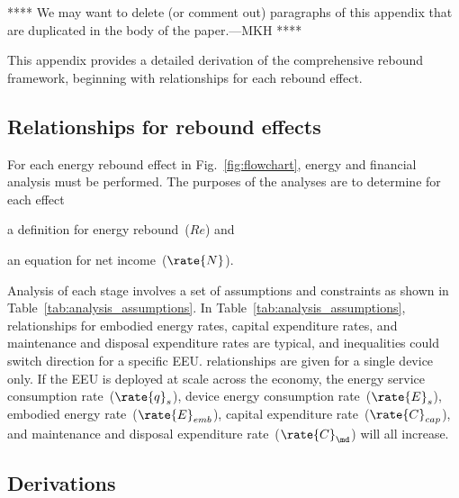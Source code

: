 

**** 
We may want to delete (or comment out)
paragraphs of this appendix that are duplicated
in the body of the paper.---MKH
****

This appendix provides a detailed derivation of the comprehensive rebound framework,
beginning with relationships for each rebound effect.


\subsection{Relationships for rebound effects}
\label{sec:relationships_for_stages}

For each energy rebound effect in Fig.~\ref{fig:flowchart},
energy and financial analysis must be performed.
The purposes of the analyses are to determine for each effect
%
\begin{enumerate*}[label={(\alph*)}]

  \item a definition for energy rebound~($Re$) and

  \item an equation for net income~($\rate{N}$).

\end{enumerate*}

Analysis of each stage involves a set of assumptions and constraints
as shown in Table~\ref{tab:analysis_assumptions}.
In Table~\ref{tab:analysis_assumptions}, 
relationships for \empleffect{} 
embodied energy rates, 
capital expenditure rates, and 
maintenance and disposal expenditure rates
are typical, and
inequalities could switch direction for a specific EEU.
\Macroeffect{} relationships are given for a single device only.
If the EEU is deployed at scale across the economy, 
the energy service consumption rate~($\rate{q}_s$), 
device energy consumption rate~($\rate{E}_s$), 
embodied energy rate~($\rate{E}_{emb}$),
capital expenditure rate~($\rate{C}_{cap}$), and 
maintenance and disposal expenditure rate~($\rate{C}_{\md}$)
will all increase.




\subsection{Derivations}
\label{sec:derivations}

